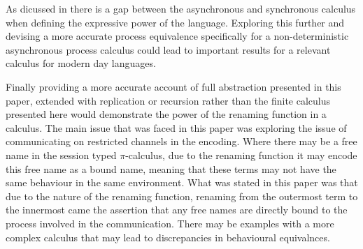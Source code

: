As dicussed in \citep{DBLP:journals/corr/Palamidessi13} there is a gap between the asynchronous and synchronous calculus when defining the expressive power of the language. Exploring this further and devising a more accurate process equivalence specifically for a non-deterministic asynchronous process calculus could lead to important results for a relevant calculus for modern day languages.

Finally providing a more accurate account of full abstraction presented in this paper, extended with replication or recursion rather than the finite calculus presented here would demonstrate the power of the renaming function in a calculus. The main issue that was faced in this paper was exploring the issue of communicating on restricted channels in the encoding. Where there may be a free name in the session typed $\pi$-calculus, due to the renaming function it may encode this free name as a bound name, meaning that these terms may not have the same behaviour in the same environment. What was stated in this paper was that due to the nature of the renaming function, renaming from the outermost term to the innermost came the assertion that any free names are directly bound to the process involved in the communication. There may be examples with a more complex calculus that may lead to discrepancies in behavioural equivalnces.

    

